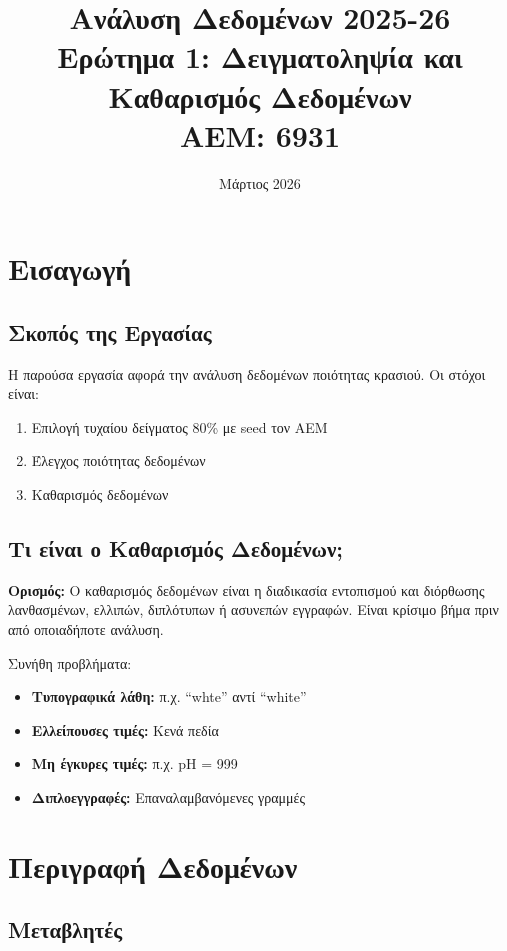 \documentclass[12pt,a4paper]{article}
\title{
    \textbf{Ανάλυση Δεδομένων 2025-26}\\[0.3cm]
    \large Ερώτημα 1: Δειγματοληψία και Καθαρισμός Δεδομένων\\[0.2cm]
    \normalsize AEM: 6931
}
\author{}
\date{Μάρτιος 2026}
\begin{document}
\maketitle
\tableofcontents
\newpage

\section{Εισαγωγή}

\subsection{Σκοπός της Εργασίας}

Η παρούσα εργασία αφορά την ανάλυση δεδομένων ποιότητας κρασιού. Οι στόχοι είναι:

\begin{enumerate}
    \item Επιλογή τυχαίου δείγματος 80\% με seed τον ΑΕΜ
    \item Έλεγχος ποιότητας δεδομένων
    \item Καθαρισμός δεδομένων
\end{enumerate}

\subsection{Τι είναι ο Καθαρισμός Δεδομένων;}

\textbf{Ορισμός:} Ο καθαρισμός δεδομένων είναι η διαδικασία εντοπισμού και διόρθωσης λανθασμένων, ελλιπών, διπλότυπων ή ασυνεπών εγγραφών. Είναι κρίσιμο βήμα πριν από οποιαδήποτε ανάλυση.

Συνήθη προβλήματα:
\begin{itemize}
    \item \textbf{Τυπογραφικά λάθη:} π.χ. ``whte'' αντί ``white''
    \item \textbf{Ελλείπουσες τιμές:} Κενά πεδία
    \item \textbf{Μη έγκυρες τιμές:} π.χ. pH = 999
    \item \textbf{Διπλοεγγραφές:} Επαναλαμβανόμενες γραμμές
\end{itemize}

\section{Περιγραφή Δεδομένων}

\subsection{Μεταβλητές}
\end{document}
